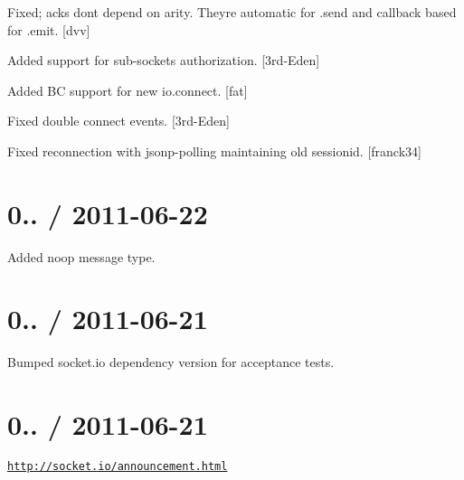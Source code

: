 \begin{DoxyItemize}
\item Fixed; acks don\textquotesingle{}t depend on arity. They\textquotesingle{}re automatic for {\ttfamily .send} and callback based for {\ttfamily .emit}. \mbox{[}dvv\mbox{]}
\item Added support for sub-\/sockets authorization. \mbox{[}3rd-\/\+Eden\mbox{]}
\item Added BC support for {\ttfamily new io.\+connect}. \mbox{[}fat\mbox{]}
\item Fixed double {\ttfamily connect} events. \mbox{[}3rd-\/\+Eden\mbox{]}
\item Fixed reconnection with jsonp-\/polling maintaining old sessionid. \mbox{[}franck34\mbox{]}
\end{DoxyItemize}

\section*{0.. / 2011-\/06-\/22 }


\begin{DoxyItemize}
\item Added {\ttfamily noop} message type.
\end{DoxyItemize}

\section*{0.. / 2011-\/06-\/21 }


\begin{DoxyItemize}
\item Bumped socket.\+io dependency version for acceptance tests.
\end{DoxyItemize}

\section*{0.. / 2011-\/06-\/21 }


\begin{DoxyItemize}
\item \href{http://socket.io/announcement.html}{\tt http\+://socket.\+io/announcement.\+html} 
\end{DoxyItemize}